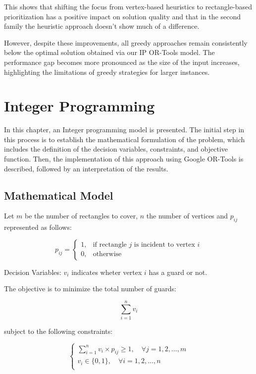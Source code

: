 \documentclass{report}
\begin{document}
\noindent This shows that shifting the focus from vertex-based heuristics to rectangle-based prioritization has a positive impact on solution quality and that in the second family the heuristic approach doesn't show much of a difference.

\noindent However, despite these improvements, all greedy approaches remain consistently below the optimal solution obtained via our IP OR-Tools model. The performance gap becomes more pronounced as the size of the input increases, highlighting the limitations of greedy strategies for larger instances.

\noindent


\chapter{Integer Programming}
In this chapter, an Integer programming model is presented. The initial step in this process is to establish the mathematical formulation of the problem, which includes the definition of the decision variables, constraints, and objective function.
Then, the implementation of this approach using Google OR-Tools is described, followed by an interpretation of the results.
\section{Mathematical Model}
Let $m$ be the number of rectangles to cover, $n$ the number of vertices and $p_{ij}$ represented as follows:

\[
p_{ij} =
\begin{cases}
1, & \text{if rectangle } j \text{ is incident to vertex } i \\
0, & \text{otherwise}
\end{cases}
\]

Decision Variables: $v_{i}$ indicates wheter vertex $i$ has a guard or not.

The objective is to minimize the total number of guards:

\[\sum_{i = 1}^{n} v_{i}\]

subject to the following constraints:

\[
\begin{cases}
	\sum_{i = 1}^{n} v_{i} \times p_{ij} \ge 1, \quad \forall j = 1,2,\dots,m \\
	v_{i} \in \{0,1\}, \quad \forall i = 1,2,\dots,n                          \\
\end{cases}
\]
\end{document}
